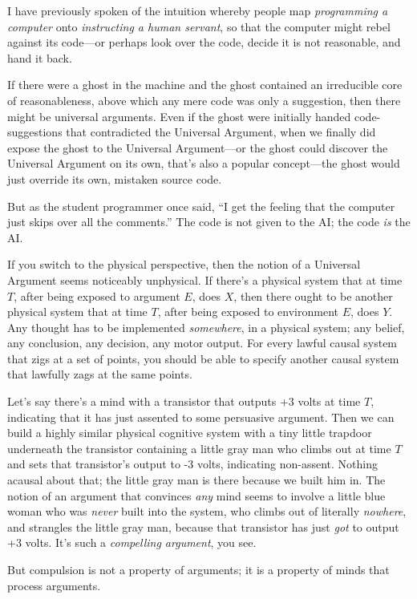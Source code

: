  I have previously spoken of the intuition whereby people map
\textit{programming a computer} onto \textit{instructing a human
servant}, so that the computer might rebel against its code---or
perhaps look over the code, decide it is not reasonable, and hand it
back.


 If there were a ghost in the machine and the ghost contained an
irreducible core of reasonableness, above which any mere code was only
a suggestion, then there might be universal arguments. Even if the
ghost were initially handed code-suggestions that contradicted the
Universal Argument, when we finally did expose the ghost to the
Universal Argument---or the ghost could discover the Universal Argument
on its own, that's also a popular concept---the ghost
would just override its own, mistaken source code.


 But as the student programmer once said, ``I get
the feeling that the computer just skips over all the
comments.'' The code is not given to the AI; the code
\textit{is} the AI.


 If you switch to the physical perspective, then the notion of a
Universal Argument seems noticeably unphysical. If
there's a physical system that at time $T$, after being
exposed to argument $E$, does $X$, then there ought to be another physical
system that at time $T$, after being exposed to environment $E$, does $Y$.
Any thought has to be implemented \textit{somewhere}, in a physical
system; any belief, any conclusion, any decision, any motor output. For
every lawful causal system that zigs at a set of points, you should be
able to specify another causal system that lawfully zags at the same
points.


 Let's say there's a mind with a
transistor that outputs +3 volts at time $T$, indicating that it has just
assented to some persuasive argument. Then we can build a highly
similar physical cognitive system with a tiny little trapdoor
underneath the transistor containing a little gray man who climbs out
at time $T$ and sets that transistor's output to -3
volts, indicating non-assent. Nothing acausal about that; the little
gray man is there because we built him in. The notion of an argument
that convinces \textit{any} mind seems to involve a little blue woman
who was \textit{never} built into the system, who climbs out of
literally \textit{nowhere}, and strangles the little gray man, because
that transistor has just \textit{got} to output +3 volts.
It's such a \textit{compelling argument}, you see.


 But compulsion is not a property of arguments; it is a property of
minds that process arguments.


